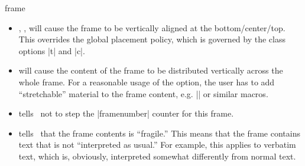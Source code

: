 \begin{environment}{{frame}}
\begin{frame}[<+->][plain]
\begin{frame}[plain]
\begin{itemize}
    The use of this option is \emph{evil}. In a (good) presentation you prepare each slide carefully and think twice before putting something on a certain slide rather than on some different slide. Using the |allowframebreaks| option invites the creation of horrible, endless presentations that resemble more a ``paper projected on the wall'' than a presentation. Nevertheless, the option does have its uses. Most noticeably, it can be convenient for automatically splitting bibliographies or long equations.

    \example
\begin{verbatim}
\begin{frame}[allowframebreaks]{References}
  \begin{thebibliography}{XX}

  \bibitem...
  \bibitem...
    ...
  \bibitem...
  \end{thebibliography}
\end{frame}
\end{verbatim}

    \example
\begin{verbatim}
\begin{frame}[allowframebreaks,allowdisplaybreaks]{A Long Equation}
  \begin{align}
    \zeta(2) &= 1 + 1/4 + 1/9 + \cdots \\
    &= ... \\
    ...
    &= \pi^2/6.
  \end{align}
\end{frame}
\end{verbatim}

  \item
    , ,  will cause the frame to be vertically aligned at the bottom/center/top. This overrides the global placement policy, which is governed by the class options |t| and |c|.
  \item
     will cause the content of the frame to be distributed vertically across the whole frame. For a reasonable usage of the option, the user has to add ``stretchable'' material to the frame content, e.g. |\vfill| or similar macros.
  \item
     tells \beamer\ not to step the |framenumber| counter for this frame.
  \item
     tells \beamer\ that the frame contents is ``fragile.'' This means that the frame contains text that is not ``interpreted as usual.'' For example, this applies to verbatim text, which is, obviously, interpreted somewhat differently from normal text.


\end{itemize}
\end{frame}
\end{frame}
\end{environment}
